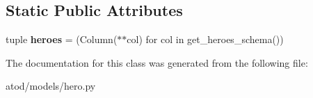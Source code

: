 \subsection*{Static Public Attributes}
\begin{DoxyCompactItemize}
\item 
tuple {\bfseries heroes} = (Column($\ast$$\ast$col) for col in get\+\_\+heroes\+\_\+schema())\hypertarget{classatod_1_1models_1_1hero_1_1_hero_model_acb4b61406491bf4a3962821a75e66022}{}\label{classatod_1_1models_1_1hero_1_1_hero_model_acb4b61406491bf4a3962821a75e66022}

\end{DoxyCompactItemize}


The documentation for this class was generated from the following file\+:\begin{DoxyCompactItemize}
\item 
atod/models/hero.\+py\end{DoxyCompactItemize}
